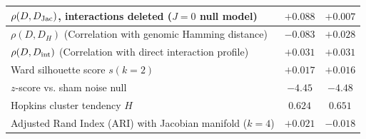 \begin{table}[t]
\begin{ruledtabular}
\begin{tabular}{lcc}
$\rho(D,D_{\rm Jac})$, interactions deleted ($J=0$ null model) & $+0.088$ & $+0.007$ \\ \hline
$\rho(D,D_H)$ (Correlation with genomic Hamming distance) & $-0.083$ & $+0.028$ \\
$\rho(D,D_{\rm int})$ (Correlation with direct interaction profile) & $+0.031$ & $+0.031$ \\ \hline
Ward silhouette score $s(k{=}2)$ & $+0.017$ & $+0.016$ \\
\quad $z$-score vs. sham noise null & $-4.45$ & $-4.48$ \\
Hopkins cluster tendency $H$ & $0.624$ & $0.651$ \\
Adjusted Rand Index (ARI) with Jacobian manifold ($k=4$) & $+0.021$ & $-0.018$ \\
\end{tabular}
\end{ruledtabular}
\end{table}